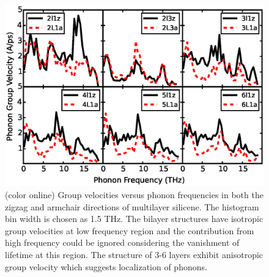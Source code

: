 \documentclass[review]{elsarticle}
\begin{document}
\begin{figure}[b]
  \includegraphics[width=0.9\linewidth]{images/gv.eps}{}
  \caption{\label{fig:gv} (color online) Group velocities versus phonon frequencies in both the zigzag and armchair directions of multilayer silicene. The histogram bin width is chosen as 1.5 THz. The bilayer structures have isotropic group velocities at low frequency region and the contribution from high frequency could be ignored considering the vanishment of lifetime at this region. The structure of 3-6 layers exhibit anisotropic group velocity which suggests localization of phonons.}
\end{figure}
\end{document}
